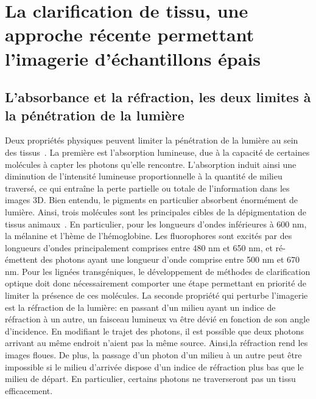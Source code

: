 \documentclass[\main/main.tex]{subfiles}
\begin{document}
\section{La clarification de tissu, une approche récente permettant l'imagerie d'échantillons épais}

\subsection{L'absorbance et la réfraction, les deux limites à la pénétration de la lumière}

\label{sec:clarification:principes}

%
Deux propriétés physiques peuvent limiter la pénétration de la lumière au sein des tissus~\cite{sandell_2011}. La première est l'absorption lumineuse, due à la capacité de certaines molécules à capter les photons qu'elle rencontre.
%
L'absorption induit ainsi une diminution de l'intensité lumineuse proportionnelle à la quantité de milieu traversé, ce qui entraîne la perte partielle ou totale de l'information dans les images 3D.
%
Bien entendu, le pigments en particulier absorbent énormément de lumière. Ainsi, trois molécules sont les principales cibles de la dépigmentation de tissus animaux~\cite{sandell_2011,antinucci_2016,pende_2020}. En particulier, pour les longueurs d'ondes inférieures à 600 nm, la mélanine et l'hème de l'hémoglobine. Les fluorophores sont excités par des longueurs d'ondes principalement comprises entre 480 nm et 650 nm, et ré-émettent des photons ayant une longueur d'onde comprise entre 500 nm et 670 nm.
Pour les lignées transgéniques, le développement de méthodes de clarification optique doit donc nécessairement comporter une étape permettant en priorité de limiter la présence de ces molécules.
%
La seconde propriété qui perturbe l'imagerie est la réfraction de la lumière: en passant d'un milieu ayant un indice de réfraction à un autre, un faisceau lumineux va être dévié en fonction de son angle d'incidence. En modifiant le trajet des photons, il est possible que deux photons arrivant au même endroit n'aient pas la même source. Ainsi,la réfraction rend les images floues.
%
De plus, la passage d'un photon d'un milieu à un autre peut être impossible si le milieu d'arrivée dispose d'un indice de réfraction plus bas que le milieu de départ. En particulier, certains photons ne traverseront pas un tissu efficacement.
\end{document}
